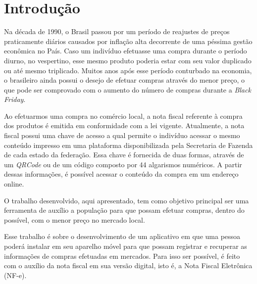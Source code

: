 \chapter{Introdução}


Na década de 1990, o Brasil passou por um período de reajustes de preços praticamente diários causados por inflação alta decorrente de uma péssima gestão econômica no País. Caso um indivíduo efetuasse uma compra durante o período diurno, no vespertino, esse mesmo produto poderia estar com seu valor duplicado ou até mesmo triplicado. Muitos anos após esse período conturbado na economia, o brasileiro ainda possui o desejo de efetuar compras através do menor preço, o que pode ser comprovado com o aumento do número de compras durante a \textit{Black Friday}.

Ao efetuarmos uma compra no comércio local, a nota fiscal referente à compra dos produtos é emitida em conformidade com a lei vigente. Atualmente, a nota fiscal possui uma chave de acesso a qual permite o indivíduo acessar o mesmo conteúdo impresso em uma plataforma disponibilizada pela Secretaria de Fazenda de cada estado da federação. Essa chave é fornecida de duas formas, através de um \textit{QRCode} ou de um código composto por 44 algarismos numéricos. A partir dessas informações, é possível acessar o conteúdo da compra em um endereço online.


O trabalho desenvolvido, aqui apresentado, tem como objetivo principal ser uma ferramenta de auxílio a população para que possam efetuar compras, dentro do possível, com o menor preço no mercado local.


Esse trabalho é sobre o desenvolvimento de um aplicativo em que uma pessoa poderá instalar em seu aparelho móvel para que possam registrar e recuperar as informações de compras efetuadas em mercados. Para isso ser possível, é feito com o auxílio da nota fiscal em sua versão digital, isto é, a Nota Fiscal Eletrônica (NF-e).

